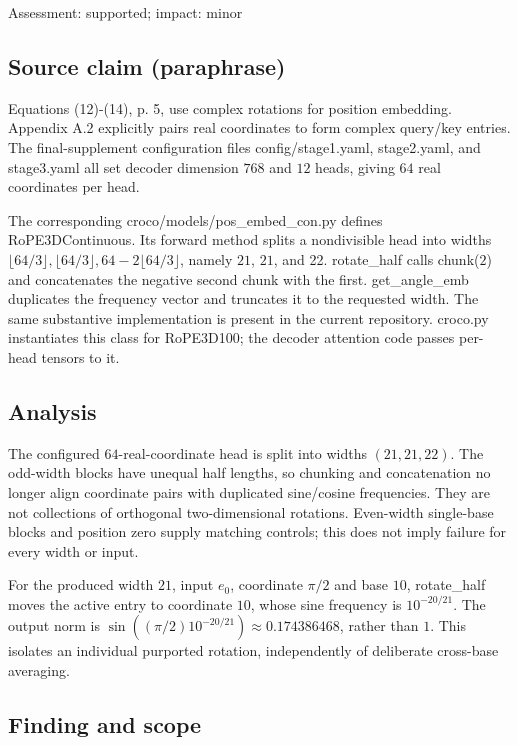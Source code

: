 \documentclass[11pt]{article}
\begin{document}
Assessment: supported; impact: minor

\subsection*{Source claim (paraphrase)}

Equations (12)-(14), p. 5, use complex rotations for position embedding. Appendix A.2 explicitly pairs real coordinates to form complex query/key entries. The final-supplement configuration files config/stage1.yaml, stage2.yaml, and stage3.yaml all set decoder dimension \(768\) and \(12\) heads, giving \(64\) real coordinates per head.

The corresponding croco/models/pos\_embed\_con.py defines RoPE3DContinuous. Its forward method splits a nondivisible head into widths \(\lfloor64/3\rfloor,\lfloor64/3\rfloor,64-2\lfloor64/3\rfloor\), namely \(21\), \(21\), and 22. rotate\_half calls chunk(\(2\)) and concatenates the negative second chunk with the first. get\_angle\_emb duplicates the frequency vector and truncates it to the requested width. The same substantive implementation is present in the current repository. croco.py instantiates this class for RoPE3D100; the decoder attention code passes per-head tensors to it.

\subsection*{Analysis}

The configured \(64\)-real-coordinate head is split into widths \((21,21,22)\). The odd-width blocks have unequal half lengths, so chunking and concatenation no longer align coordinate pairs with duplicated sine/cosine frequencies. They are not collections of orthogonal two-dimensional rotations. Even-width single-base blocks and position zero supply matching controls; this does not imply failure for every width or input.

For the produced width \(21\), input \(e_0\), coordinate \(\pi/2\) and base \(10\), rotate\_half moves the active entry to coordinate \(10\), whose sine frequency is \(10^{-20/21}\). The output norm is \(\sin((\pi/2)10^{-20/21})\approx0.174386468\), rather than \(1\). This isolates an individual purported rotation, independently of deliberate cross-base averaging.

\subsection*{Finding and scope}
\end{document}
